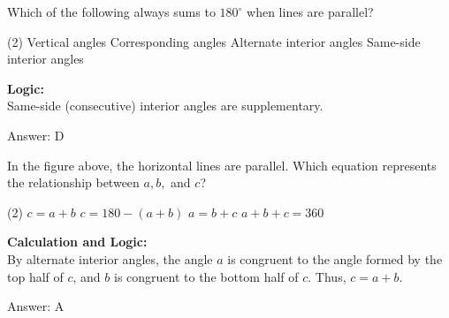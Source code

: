 \documentclass[11pt,paper=a4,answers]{exam}
\begin{document}
\begin{questions}
\vspace{60pt}

\question
Which of the following always sums to $180^\circ$ when lines are parallel?
\begin{tasks}(2)
    \task Vertical angles
    \task Corresponding angles
    \task Alternate interior angles
    \task Same-side interior angles
\end{tasks}

\begin{solution}
\textbf{Logic:} \\
Same-side (consecutive) interior angles are supplementary.

\vspace{30pt}

Answer: \colorbox{yellow!100}{D}
\end{solution}

\vspace{60pt}

\question
\begin{center}
\end{center}
In the figure above, the horizontal lines are parallel. Which equation represents the relationship between $a, b,$ and $c$?
\begin{tasks}(2)
    \task $c = a + b$
    \task $c = 180 - (a + b)$
    \task $a = b + c$
    \task $a + b + c = 360$
\end{tasks}

\begin{solution}
\textbf{Calculation and Logic:} \\
By alternate interior angles, the angle $a$ is congruent to the angle formed by the top half of $c$, and $b$ is congruent to the bottom half of $c$. Thus, $c = a + b$.

\vspace{30pt}

Answer: \colorbox{yellow!100}{A}
\end{solution}

\vspace{60pt}


\end{questions}
\end{document}
